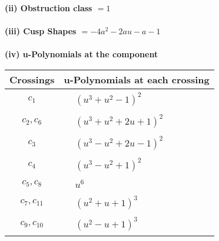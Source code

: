 \documentclass[1p]{elsarticle_modified}
\theoremstyle{definition}
\begin{document}
\flushleft \textbf{(ii) Obstruction class $= 1$}\\~\\
\flushleft \textbf{(iii) Cusp Shapes $= -4 a^2-2 a u- a-1$}\\~\\
\newpage\renewcommand{\arraystretch}{1}
\flushleft \textbf{(iv) u-Polynomials at the component}\newline \\
\begin{tabular}{m{50pt}|m{274pt}}
Crossings & \hspace{64pt}u-Polynomials at each crossing \\
\hline $$\begin{aligned}c_{1}\end{aligned}$$&$\begin{aligned}
&(u^3+u^2-1)^2
\end{aligned}$\\
\hline $$\begin{aligned}c_{2},c_{6}\end{aligned}$$&$\begin{aligned}
&(u^3+u^2+2 u+1)^2
\end{aligned}$\\
\hline $$\begin{aligned}c_{3}\end{aligned}$$&$\begin{aligned}
&(u^3- u^2+2 u-1)^2
\end{aligned}$\\
\hline $$\begin{aligned}c_{4}\end{aligned}$$&$\begin{aligned}
&(u^3- u^2+1)^2
\end{aligned}$\\
\hline $$\begin{aligned}c_{5},c_{8}\end{aligned}$$&$\begin{aligned}
&u^6
\end{aligned}$\\
\hline $$\begin{aligned}c_{7},c_{11}\end{aligned}$$&$\begin{aligned}
&(u^2+u+1)^3
\end{aligned}$\\
\hline $$\begin{aligned}c_{9},c_{10}\end{aligned}$$&$\begin{aligned}
&(u^2- u+1)^3
\end{aligned}$\\
\hline
\end{tabular}\\~\\
\end{document}
